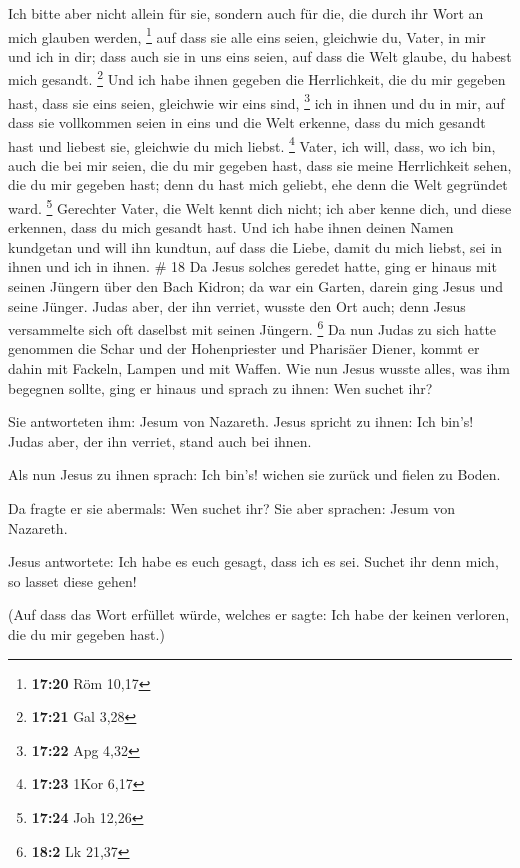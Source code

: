  Ich bitte aber nicht allein für sie, sondern auch für
die, die durch ihr Wort an mich glauben werden, \footnote{\textbf{17:20}
  Röm 10,17}  auf dass sie alle eins seien, gleichwie du,
Vater, in mir und ich in dir; dass auch sie in uns eins seien, auf dass
die Welt glaube, du habest mich gesandt. \footnote{\textbf{17:21} Gal
  3,28}  Und ich habe ihnen gegeben die Herrlichkeit, die
du mir gegeben hast, dass sie eins seien, gleichwie wir eins sind,
\footnote{\textbf{17:22} Apg 4,32}  ich in ihnen und du
in mir, auf dass sie vollkommen seien in eins und die Welt erkenne, dass
du mich gesandt hast und liebest sie, gleichwie du mich liebst.
\footnote{\textbf{17:23} 1Kor 6,17}  Vater, ich will,
dass, wo ich bin, auch die bei mir seien, die du mir gegeben hast, dass
sie meine Herrlichkeit sehen, die du mir gegeben hast; denn du hast mich
geliebt, ehe denn die Welt gegründet ward. \footnote{\textbf{17:24} Joh
  12,26}  Gerechter Vater, die Welt kennt dich nicht; ich
aber kenne dich, und diese erkennen, dass du mich gesandt hast.
 Und ich habe ihnen deinen Namen kundgetan und will ihn
kundtun, auf dass die Liebe, damit du mich liebst, sei in ihnen und ich
in ihnen. \# 18  Da Jesus solches geredet hatte, ging er
hinaus mit seinen Jüngern über den Bach Kidron; da war ein Garten,
darein ging Jesus und seine Jünger.  Judas aber, der ihn
verriet, wusste den Ort auch; denn Jesus versammelte sich oft daselbst
mit seinen Jüngern. \footnote{\textbf{18:2} Lk 21,37}  Da
nun Judas zu sich hatte genommen die Schar und der Hohenpriester und
Pharisäer Diener, kommt er dahin mit Fackeln, Lampen und mit Waffen.
 Wie nun Jesus wusste alles, was ihm begegnen sollte, ging
er hinaus und sprach zu ihnen: Wen suchet ihr?

 Sie antworteten ihm: Jesum von Nazareth. Jesus spricht zu
ihnen: Ich bin's! Judas aber, der ihn verriet, stand auch bei ihnen.

 Als nun Jesus zu ihnen sprach: Ich bin's! wichen sie
zurück und fielen zu Boden.

 Da fragte er sie abermals: Wen suchet ihr? Sie aber
sprachen: Jesum von Nazareth.

 Jesus antwortete: Ich habe es euch gesagt, dass ich es
sei. Suchet ihr denn mich, so lasset diese gehen!

 (Auf dass das Wort erfüllet würde, welches er sagte: Ich
habe der keinen verloren, die du mir gegeben hast.)

